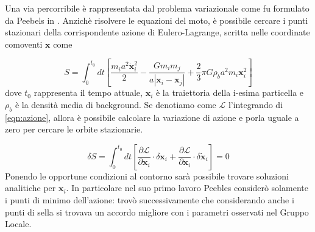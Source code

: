 Una via percorribile è rappresentata dal problema variazionale come fu formulato da Peebels in \cite{peebles}.
Anzichè risolvere le equazioni del moto, è possibile cercare i punti stazionari della corrispondente
azione di Eulero-Lagrange, scritta nelle coordinate comoventi $\bm{x}$ come

\begin{equation}
    \label{eqn:azione}
    S = \int_0^{t_0} dt \left[\frac{m_i a^2 \dot{\bm{x}}_i^2}{2} - \frac{Gm_i m_j}{a|\bm{x}_i-\bm{x}_j|}+\frac{2}{3}\pi G\rho_ba^2 m_i \bm{x}_i^2\right]
\end{equation}
dove $t_0$ rappresenta il tempo attuale, $\bm{x}_i$ è la traiettoria della i-esima particella e $\rho_b$
è la densità media di background. Se denotiamo come $\mathcal{L}$ l'integrando di \ref{eqn:azione}, allora
è possibile calcolare la variazione di azione e porla uguale a zero per cercare le orbite stazionarie.

\begin{equation}
    \delta S = \int_0^{t_0} dt \left[\frac{\partial \mathcal{L}}{\partial \bm{x}_i}\cdot \delta\bm{x}_i + \frac{\partial\mathcal{L}}{\partial \bm{x}_i}\cdot \delta \dot{\bm{x}}_i\right] = 0 
\end{equation}
Ponendo le opportune condizioni al contorno sarà possibile trovare soluzioni analitiche per $\bm{x}_i$.
In particolare nel suo primo lavoro Peebles considerò solamente i punti di minimo dell'azione: trovò
successivamente che considerando anche i punti di sella si trovava un accordo migliore con i parametri
osservati nel Gruppo Locale.


